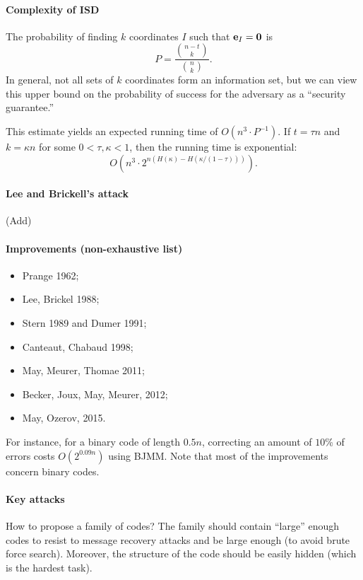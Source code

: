 \documentclass[a4paper, 11pt, openany]{book}
\numberwithin{equation}{section}
\theoremstyle{plain}
\theoremstyle{definition}
\begin{document}
\paragraph{Complexity of ISD}
The probability of finding $k$ coordinates $I$ such that ${\bf e}_I = {\bf 0}$ is
\[
	P = \frac{ \binom{n-t}{k} }{ \binom{n}{k} }.
\]
In general, not all sets of $k$ coordinates form an information set, but we can view this upper bound on the probability of success for the adversary as a ``security guarantee.''

This estimate yields an expected running time of $O(n^3 \cdot P^{-1})$. If $t = \tau n$ and $k = \kappa n$ for some $0 < \tau, \kappa < 1$, then the running time is exponential:
\[
	O \left( n^3 \cdot 2^{ n ( H(\kappa) - H( \kappa/ (1- \tau)) ) } \right).
\]



\paragraph{Lee and Brickell's attack}

(Add)


\paragraph{Improvements (non-exhaustive list)}
\begin{itemize}
\item Prange 1962;
\item Lee, Brickel 1988;
\item Stern 1989 and Dumer 1991;
\item Canteaut, Chabaud 1998;
\item May, Meurer, Thomae 2011;
\item Becker, Joux, May, Meurer, 2012;
\item May, Ozerov, 2015.
\end{itemize}

For instance, for a binary code of length $0.5n$, correcting an amount of $10$\% of errors costs $O(2^{0.09n})$ using BJMM. Note that most of the improvements concern binary codes.


\paragraph{Key attacks}
How to propose a family of codes? The family should contain ``large'' enough codes to resist to message recovery attacks and be large enough (to avoid brute force search). Moreover, the structure of the code should be easily hidden (which is the hardest task).
\end{document}
